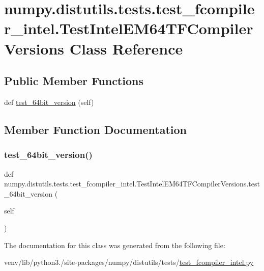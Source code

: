 \hypertarget{classnumpy_1_1distutils_1_1tests_1_1test__fcompiler__intel_1_1TestIntelEM64TFCompilerVersions}{}\section{numpy.\+distutils.\+tests.\+test\+\_\+fcompiler\+\_\+intel.\+Test\+Intel\+E\+M64\+T\+F\+Compiler\+Versions Class Reference}
\label{classnumpy_1_1distutils_1_1tests_1_1test__fcompiler__intel_1_1TestIntelEM64TFCompilerVersions}
\subsection*{Public Member Functions}
\begin{DoxyCompactItemize}
\item 
def \hyperlink{classnumpy_1_1distutils_1_1tests_1_1test__fcompiler__intel_1_1TestIntelEM64TFCompilerVersions_a3f1f357eff0dad002bf5c3008f0540a8}{test\+\_\+64bit\+\_\+version} (self)
\end{DoxyCompactItemize}


\subsection{Member Function Documentation}
\mbox{\label{classnumpy_1_1distutils_1_1tests_1_1test__fcompiler__intel_1_1TestIntelEM64TFCompilerVersions_a3f1f357eff0dad002bf5c3008f0540a8}} 
\subsubsection{\texorpdfstring{test\+\_\+64bit\+\_\+version()}{test\_64bit\_version()}}
{\footnotesize\ttfamily def numpy.\+distutils.\+tests.\+test\+\_\+fcompiler\+\_\+intel.\+Test\+Intel\+E\+M64\+T\+F\+Compiler\+Versions.\+test\+\_\+64bit\+\_\+version (\begin{DoxyParamCaption}\item[{}]{self }\end{DoxyParamCaption})}



The documentation for this class was generated from the following file\+:\begin{DoxyCompactItemize}
\item 
venv/lib/python3./site-\/packages/numpy/distutils/tests/\hyperlink{test__fcompiler__intel_8py}{test\+\_\+fcompiler\+\_\+intel.\+py}\end{DoxyCompactItemize}

